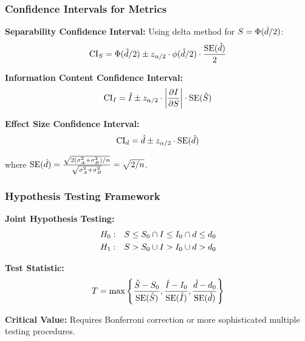 \subsubsection{Confidence Intervals for Metrics}

\textbf{Separability Confidence Interval:}
Using delta method for $S = \Phi(\hat{d}/2)$:
\begin{equation}
\text{CI}_S = \Phi(\hat{d}/2) \pm z_{\alpha/2} \cdot \phi(\hat{d}/2) \cdot \frac{\text{SE}(\hat{d})}{2}
\end{equation}

\textbf{Information Content Confidence Interval:}
\begin{equation}
\text{CI}_{I} = \hat{I} \pm z_{\alpha/2} \cdot \left|\frac{\partial I}{\partial S}\right| \cdot \text{SE}(\hat{S})
\end{equation}

\textbf{Effect Size Confidence Interval:}
\begin{equation}
\text{CI}_{d} = \hat{d} \pm z_{\alpha/2} \cdot \text{SE}(\hat{d})
\end{equation}

where $\text{SE}(\hat{d}) = \frac{\sqrt{2(\sigma_A^2 + \sigma_B^2)/n}}{\sqrt{\sigma_A^2 + \sigma_B^2}} = \sqrt{2/n}$.

\subsubsection{Hypothesis Testing Framework}

\textbf{Joint Hypothesis Testing:}
\begin{align}
H_0: & \quad S \leq S_0 \cap I \leq I_0 \cap d \leq d_0 \\
H_1: & \quad S > S_0 \cup I > I_0 \cup d > d_0
\end{align}

\textbf{Test Statistic:}
\begin{equation}
T = \max\left\{\frac{\hat{S} - S_0}{\text{SE}(\hat{S})}, \frac{\hat{I} - I_0}{\text{SE}(\hat{I})}, \frac{\hat{d} - d_0}{\text{SE}(\hat{d})}\right\}
\end{equation}

\textbf{Critical Value:} Requires Bonferroni correction or more sophisticated multiple testing procedures.

